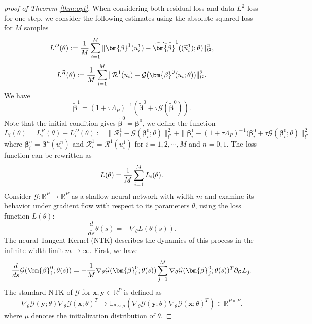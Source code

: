 \documentclass[preprint,12pt]{elsarticle}
\theoremstyle{plain}
\numberwithin{figure}{section}
\numberwithin{table}{section}
\begin{document}
\begin{proof}[proof of Theorem \ref{thm:opt}]
When considering both residual loss and data $L^2$ loss for one-step, we consider the following estimates using the absolute squared loss for $M$ samples
\begin{equation}
	L^D(\theta):={1\over M}\sum_{i=1}^M \| \bm{\beta}^1(u^1_i)- \widetilde{\bm{\beta}}^1((\widetilde{u}^1_i);\theta)\|_{l^2}^2,
\end{equation}
\begin{equation}
	L^R(\theta):=  {1\over M}\sum_{i=1}^M \|\mathcal{R}^1(u_i)- \mathcal{G}({\bm{\beta}}^0({u}_i;\theta))\|_{l^2}^2.
\end{equation}
We have
	\begin{equation}
		\widetilde{\bm{\beta}}^1 = (1+\tau\Lambda_P)^{-1}(\widetilde{\bm{\beta}}^0+\tau\mathcal{G}(\widetilde{\bm{\beta}}^0)).
	\end{equation}
	Note that the initial condition gives $\widetilde{\bm{\beta}}^0=\bm{\beta}^0$, 
	we define the function 
	\begin{equation}
		L_i(\theta)=L_i^R(\theta)+L_i^D(\theta):= \|\mathcal{R}^1_i - \mathcal{G}(\bm{\beta}_i^0;\theta)\|_{l^2}^2 + \|\bm{\beta}_i^1-(1+\tau\Lambda_P)^{-1}(\bm{\beta}_i^0+\tau\mathcal{G}(\bm{\beta}_i^0;\theta)\|_{l^2}^2
	\end{equation}
	where $\bm{\beta}_i^n= \bm{\beta}^n(u_i^n)$ and $\mathcal{R}_i^1= \mathcal{R}^1(u_i^1)$ for $i=1,2,\cdots,M$ and $n=0,1$.
	The loss function can be rewritten as
	\begin{equation}
		L(\theta) = {1\over M}\sum_{i=1}^M L_i(\theta).
	\end{equation}
	Consider $\mathcal{G} : \mathbb{R}^P \to \mathbb{R}^P$ as a shallow neural network with width $m$ and examine its behavior under gradient flow with respect to its parameters $\theta$, using the loss function $L(\theta)$:
	\begin{equation}
		\frac{d}{ds}\theta(s)=-\nabla_\theta L(\theta(s)).
	\end{equation}
	The neural Tangent Kernel (NTK) \cite{jacot2018neural} describes the dynamics of this process in the infinite-width limit $m\rightarrow\infty$. First, we have
	\begin{equation}
		\frac{d}{ds}\mathcal{G}(\bm{\beta}_i^0;\theta(s)) = -{1\over M}\nabla_\theta \mathcal{G}(\bm{\beta}_i^0;\theta(s))\sum_{j=1}^M  \nabla_\theta \mathcal{G}(\bm{\beta}_j^0;\theta(s))^T\partial_{\mathcal{G}}{L}_j.
	\end{equation}
	The standard NTK of $\mathcal{G}$ for $\bm{x},\bm{y}\in\mathbb{R}^P$ is defined as
	\begin{equation}
		\nabla_\theta \mathcal{G}(\bm{y};\theta)  \nabla_\theta \mathcal{G}(\bm{x};\theta)^T \rightarrow \mathbb{E}_{\theta\sim \mu}(\nabla_\theta \mathcal{G}(\bm{y};\theta)  \nabla_\theta \mathcal{G}(\bm{x};\theta)^T )\in\mathbb{R}^{P\times P} .
	\end{equation}
	where $\mu$ denotes the initialization distribution of $\theta$.
	

\end{proof}
\end{document}
